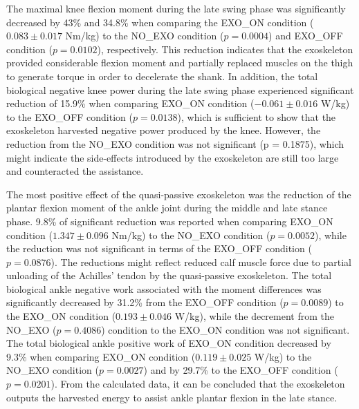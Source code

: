 \documentclass[twocolumn,cleanfoot,10pt]{asme2ej}
\begin{document}
The maximal knee flexion moment during the late swing phase was significantly decreased by 43\% and 34.8\% when comparing the EXO\_ON condition ($0.083\pm0.017$ Nm/kg) to the NO\_EXO condition ($p = 0.0004$) and EXO\_OFF condition ($p = 0.0102$), respectively. This reduction indicates that the exoskeleton provided considerable flexion moment and partially replaced muscles on the thigh to generate torque in order to decelerate the shank. In addition, the total biological negative knee power during the late swing phase experienced significant reduction of 15.9\% when comparing EXO\_ON condition ($-0.061\pm0.016$ W/kg) to the EXO\_OFF condition ($p = 0.0138$), which is sufficient to show that the exoskeleton harvested negative power produced by the knee. However, the reduction from the NO\_EXO condition was not significant (p = 0.1875), which might indicate the side-effects introduced by the exoskeleton are still too large and counteracted the assistance.


The most positive effect of the quasi-passive exoskeleton was the reduction of the plantar flexion moment of the ankle joint during the middle and late stance phase. 9.8\% of significant reduction was reported when comparing EXO\_ON condition ($1.347\pm0.096$ Nm/kg) to the NO\_EXO condition ($p = 0.0052$), while the reduction was not significant in terms of the EXO\_OFF condition ($p = 0.0876$). The reductions might reflect reduced calf muscle force due to partial unloading of the Achilles’ tendon by the quasi-passive exoskeleton. The total biological ankle negative work associated with the moment differences was significantly decreased by 31.2\% from the EXO\_OFF condition ($p = 0.0089$) to the EXO\_ON condition ($0.193\pm0.046$ W/kg), while the decrement from the NO\_EXO ($p = 0.4086$) condition to the EXO\_ON condition was not significant. The total biological ankle positive work of EXO\_ON condition decreased by 9.3\% when comparing EXO\_ON condition ($0.119\pm0.025$ W/kg) to the NO\_EXO condition ($p = 0.0027$) and by 29.7\% to the EXO\_OFF condition ($p = 0.0201$). From the calculated data, it can be concluded that the exoskeleton outputs the harvested energy to assist ankle plantar flexion in the late stance. 
\end{document}
